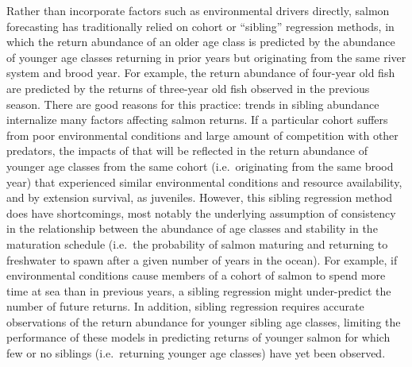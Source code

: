 \documentclass[
]{article}
\begin{document}
Rather than incorporate factors such as environmental drivers directly, salmon forecasting has traditionally relied on cohort or ``sibling'' regression methods, in which the return abundance of an older age class is predicted by the abundance of younger age classes returning in prior years but originating from the same river system and brood year. For example, the return abundance of four-year old fish are predicted by the returns of three-year old fish observed in the previous season. There are good reasons for this practice: trends in sibling abundance internalize many factors affecting salmon returns. If a particular cohort suffers from poor environmental conditions and large amount of competition with other predators, the impacts of that will be reflected in the return abundance of younger age classes from the same cohort (i.e.~originating from the same brood year) that experienced similar environmental conditions and resource availability, and by extension survival, as juveniles. However, this sibling regression method does have shortcomings, most notably the underlying assumption of consistency in the relationship between the abundance of age classes and stability in the maturation schedule (i.e.~the probability of salmon maturing and returning to freshwater to spawn after a given number of years in the ocean). For example, if environmental conditions cause members of a cohort of salmon to spend more time at sea than in previous years, a sibling regression might under-predict the number of future returns. In addition, sibling regression requires accurate observations of the return abundance for younger sibling age classes, limiting the performance of these models in predicting returns of younger salmon for which few or no siblings (i.e.~returning younger age classes) have yet been observed.
\end{document}
